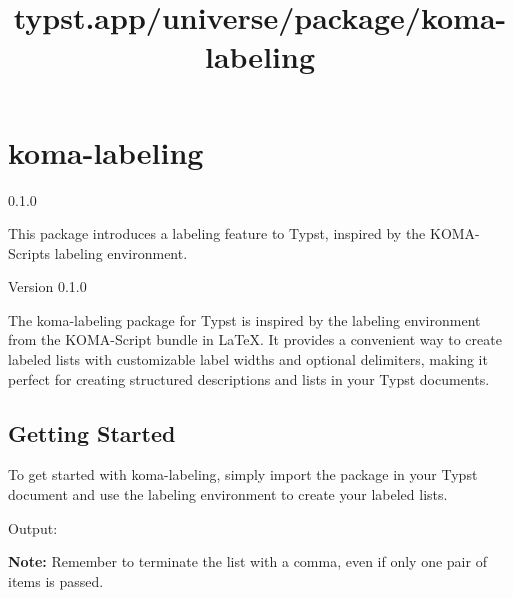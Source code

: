 \title{typst.app/universe/package/koma-labeling}

\label{banner}
\section{koma-labeling}\label{koma-labeling}

{ 0.1.0 }

This package introduces a labeling feature to Typst, inspired by the
KOMA-Script\textquotesingle s labeling environment.

\label{readme}
Version 0.1.0

The koma-labeling package for Typst is inspired by the labeling
environment from the KOMA-Script bundle in LaTeX. It provides a
convenient way to create labeled lists with customizable label widths
and optional delimiters, making it perfect for creating structured
descriptions and lists in your Typst documents.

\subsection{Getting Started}\label{getting-started}

To get started with koma-labeling, simply import the package in your
Typst document and use the labeling environment to create your labeled
lists.

\begin{Shaded}
\begin{Highlighting}[]

\NormalTok{  (}
\NormalTok{  )}
\NormalTok{)}


\NormalTok{  (}
\NormalTok{    ([\#lorem(1)], [\#lorem(10)]),}
\NormalTok{    ([\#lorem(2)], [\#lorem(20)]),}
\NormalTok{    ([\#lorem(3)], [\#lorem(30)]),}
\NormalTok{  )}
\NormalTok{)}
\end{Highlighting}
\end{Shaded}

Output:


\textbf{Note:} Remember to terminate the list with a comma, even if only
one pair of items is passed.

